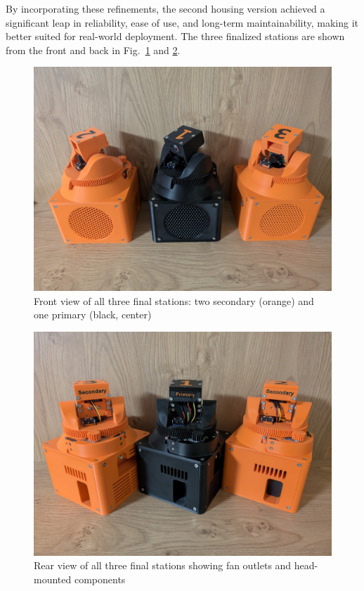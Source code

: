 By incorporating these refinements, the second housing version achieved a significant leap in reliability, ease of use, and long-term maintainability, making it better suited for real-world deployment. The three finalized stations are shown from the front and back in Fig.~\ref{fig:finalstationsfront} and \ref{fig:finalstationsback}.

\begin{figure}[H]
	\centering
	\includegraphics[width=1.0\linewidth]{figures/final_stations_front}
	\caption{Front view of all three final stations: two secondary (orange) and one primary (black, center)}
	\label{fig:finalstationsfront}
\end{figure}

\begin{figure}[H]
	\centering
	\includegraphics[width=1.0\linewidth]{figures/final_stations_back}
	\caption{Rear view of all three final stations showing fan outlets and head-mounted components}
	\label{fig:finalstationsback}
\end{figure}


